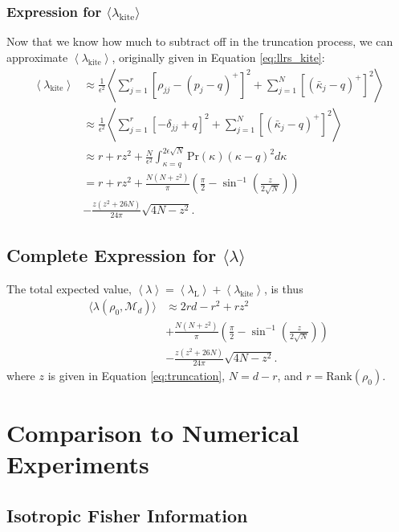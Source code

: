 \documentclass[aps,pra, twocolumn]{revtex4-1}
\newcommand{\M}{\mathcal{M}}
\newcommand{\expect}[1]{\ensuremath{\left\langle#1\right\rangle}}
\begin{document}
\subsubsection{Expression for $\langle \lambda_{\mathrm{kite}}\rangle$}
Now that we know how much to subtract off in the truncation process, we can approximate $\expect{\lambda_{\mathrm{kite}}}$, originally given in Equation \eqref{eq:llrs_kite}:
\begin{align}
\nonumber \expect{\lambda_{\mathrm{kite}}} &\approx  \frac{1}{\epsilon^{2}}\left\langle\sum_{j=1}^{r}[\rho_{jj}- (p_j-q)^{+}]^2 + \sum_{j=1}^{N}\left[(\bar{\kappa}_j-q)^+\right]^2 \right\rangle\\
\nonumber &\approx \frac{1}{\epsilon^{2}} \left\langle\sum_{j=1}^{r}[-\delta_{jj} +  q ]^2 + \sum_{j=1}^{N}\left[(\bar{\kappa}_j-q)^+\right]^2 \right\rangle\\
\nonumber  &\approx r + rz^2 + \frac{N}{\epsilon^{2}}\int_{\kappa=q}^{2\epsilon\sqrt{N}}{ \mathrm{Pr}(\kappa)(\kappa-q)^2 d\kappa} \\
\nonumber &=r + rz^{2} + \frac{N(N+z^{2})}{\pi}\left(\frac{\pi}{2} - \sin^{-1}\left(\frac{z}{2\sqrt{N}}\right)\right) \\
& - \frac{z(z^{2}+26N)}{24\pi}\sqrt{4N-z^{2}}.
\end{align}

\subsection{Complete Expression for $\langle \lambda \rangle$}
\label{subsec:LLRS}
The total expected value, $\expect{\lambda} = \expect{\lambda_{\mathrm{L}}} + \expect{\lambda_{\mathrm{kite}}}$, is thus
\begin{align}
\label{eq:ourLLRS}
\nonumber \langle \lambda(\rho_{0}, \M_{d}) \rangle &\approx 2rd - r^{2}+rz^{2}\\
\nonumber & + \frac{N(N+z^{2})}{\pi}\left(\frac{\pi}{2} - \sin^{-1}\left(\frac{z}{2\sqrt{N}}\right)\right) \\
& - \frac{z(z^{2}+26N)}{24\pi}\sqrt{4N-z^{2}}.
\end{align}
where $z$ is given in Equation \eqref{eq:truncation}, $N=d-r$, and $r = \mathrm{Rank}(\rho_{0})$.

\section{Comparison to Numerical Experiments}

\subsection{Isotropic Fisher Information}
\label{sec:theorycomp1}
\end{document}
